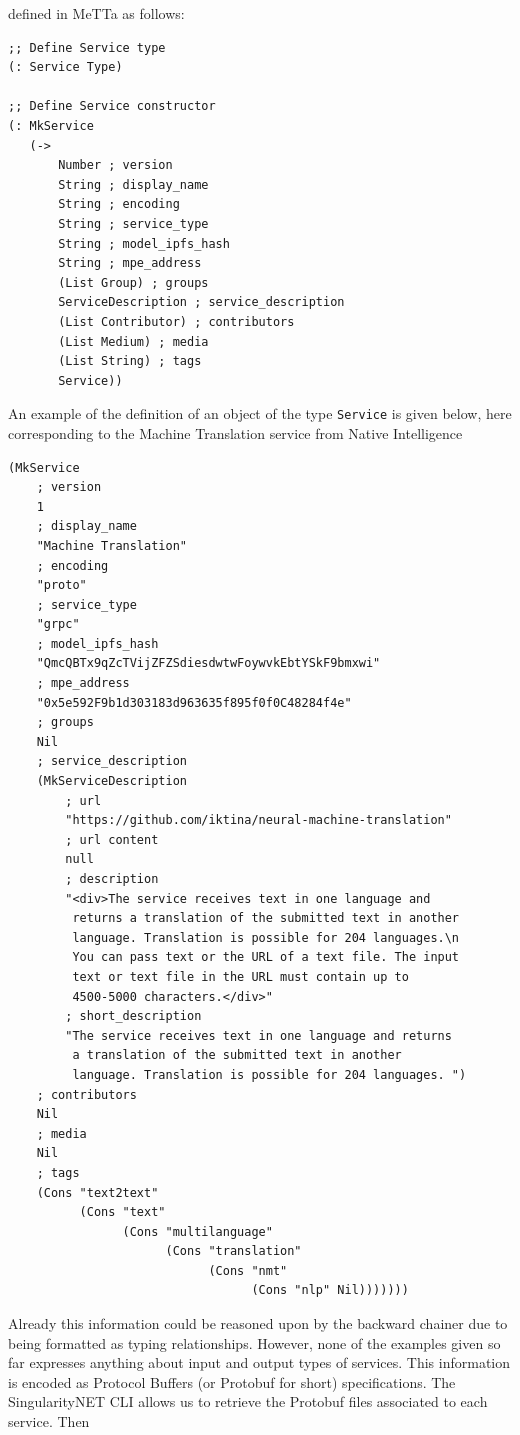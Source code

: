 \documentclass[]{report}
\begin{document}
defined in MeTTa as follows:
\begin{verbatim}
;; Define Service type
(: Service Type)

;; Define Service constructor
(: MkService
   (->
       Number ; version
       String ; display_name
       String ; encoding
       String ; service_type
       String ; model_ipfs_hash
       String ; mpe_address
       (List Group) ; groups
       ServiceDescription ; service_description
       (List Contributor) ; contributors
       (List Medium) ; media
       (List String) ; tags
       Service))
\end{verbatim}
An example of the definition of an object of the type
\texttt{Service} is given below, here corresponding to the
Machine Translation service from Native Intelligence
\begin{verbatim}
(MkService
    ; version
    1
    ; display_name
    "Machine Translation"
    ; encoding
    "proto"
    ; service_type
    "grpc"
    ; model_ipfs_hash
    "QmcQBTx9qZcTVijZFZSdiesdwtwFoywvkEbtYSkF9bmxwi"
    ; mpe_address
    "0x5e592F9b1d303183d963635f895f0f0C48284f4e"
    ; groups
    Nil
    ; service_description
    (MkServiceDescription
        ; url
        "https://github.com/iktina/neural-machine-translation"
        ; url content
        null
        ; description
        "<div>The service receives text in one language and
         returns a translation of the submitted text in another
         language. Translation is possible for 204 languages.\n
         You can pass text or the URL of a text file. The input
         text or text file in the URL must contain up to
         4500-5000 characters.</div>"
        ; short_description
        "The service receives text in one language and returns
         a translation of the submitted text in another
         language. Translation is possible for 204 languages. ")
    ; contributors
    Nil
    ; media
    Nil
    ; tags
    (Cons "text2text"
          (Cons "text"
                (Cons "multilanguage"
                      (Cons "translation"
                            (Cons "nmt"
                                  (Cons "nlp" Nil)))))))
\end{verbatim}
Already this information could be reasoned upon by the backward
chainer due to being formatted as typing relationships.  However, none
of the examples given so far expresses anything about input and output
types of services.  This information is encoded as Protocol Buffers
(or Protobuf for short) specifications.  The SingularityNET CLI allows
us to retrieve the Protobuf files associated to each service.  Then
\end{document}

